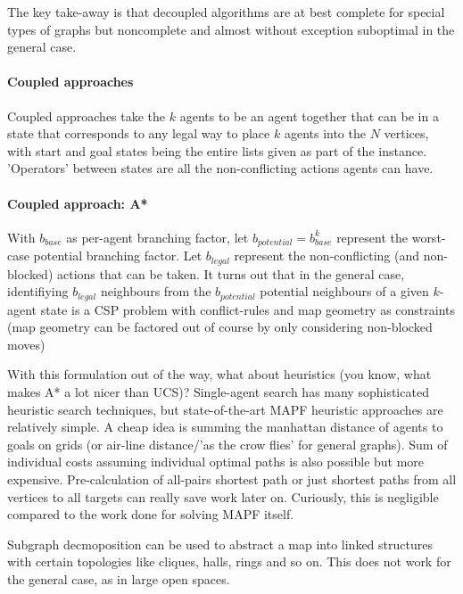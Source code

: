 \documentclass[a4paper,10pt,english]{article}
\begin{document}
	The key take-away is that decoupled algorithms are at best complete for special types of graphs but noncomplete and almost without exception suboptimal in the general case.
	\paragraph{Coupled approaches}
	Coupled approaches take the $k$ agents to be an agent together that can be in a state that corresponds to any legal way to place $k$ agents into the $N$ vertices, with start and goal states being the entire lists given as part of the instance. 'Operators' between states are all the non-conflicting actions agents can have.
	\paragraph{Coupled approach: A*}
	With $b_{base}$ as per-agent branching factor, let $b_{potential} = b_{base}^k$ represent the worst-case potential branching factor. Let $b_{legal}$ represent the non-conflicting (and non-blocked) actions that can be taken. It turns out that in the general case, identifiying $b_{legal}$ neighbours from the $b_{potential}$ potential neighbours of a given $k$-agent state is a CSP problem with conflict-rules and map geometry as constraints (map geometry can be factored out of course by only considering non-blocked moves)
	
	With this formulation out of the way, what about heuristics (you know, what makes A* a lot nicer than UCS)? Single-agent search has many sophisticated heuristic search techniques, but state-of-the-art MAPF heuristic approaches are relatively simple. A cheap idea is summing the manhattan distance of agents to goals on grids (or air-line distance/'as the crow flies' for general graphs). Sum of individual costs assuming individual optimal paths is also possible but more expensive. Pre-calculation of all-pairs shortest path or just shortest paths from all vertices to all targets can really save work later on. Curiously, this is negligible compared to the work done for solving MAPF itself.
	
	Subgraph decmoposition can be used to abstract a map into linked structures with certain topologies like cliques, halls, rings and so on. This does not work for the general case, as in large open spaces.
	
\end{document}
